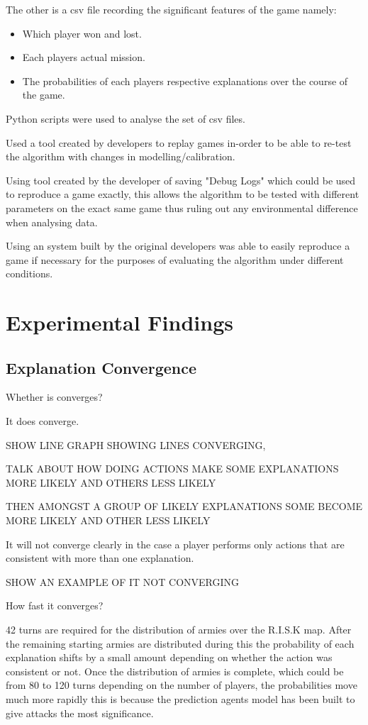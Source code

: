 \documentclass[parskip]{cs4rep}
\begin{document}
The other is a csv file recording the significant features of the game namely:

\begin{itemize}
\item
Which player won and lost.
\item
Each players actual mission.
\item
The probabilities of each players respective explanations over the course of the game.
\end{itemize}

Python scripts were used to analyse the set of csv files.

Used a tool created by developers to replay games in-order to be able to re-test the algorithm with changes in modelling/calibration.

Using tool created by the developer of saving "Debug Logs" which could be used to reproduce a game exactly, this allows the algorithm to be tested with different parameters on the exact same game thus ruling out any environmental difference when analysing data.

Using an system built by the original developers was able to easily reproduce a game if necessary for the purposes of evaluating the algorithm under different conditions.

\section{Experimental Findings}

\subsection{Explanation Convergence}

Whether is converges?

It does converge.

SHOW LINE GRAPH SHOWING LINES CONVERGING, 

TALK ABOUT HOW DOING ACTIONS MAKE SOME EXPLANATIONS MORE LIKELY AND OTHERS LESS LIKELY

THEN AMONGST A GROUP OF LIKELY EXPLANATIONS SOME BECOME MORE LIKELY AND OTHER LESS LIKELY

It will not converge clearly in the case a player performs only actions that are consistent with more than one explanation.

SHOW AN EXAMPLE OF IT NOT CONVERGING

How fast it converges?

42 turns are required for the distribution of armies over the R.I.S.K map. After the remaining starting armies are distributed during this the probability of each explanation shifts by a small amount depending on whether the action was consistent or not. Once the distribution of armies is complete, which could be from 80 to 120 turns depending on the number of players, the probabilities move much more rapidly this is because the prediction agents model has been built to give attacks the most significance.
\end{document}
